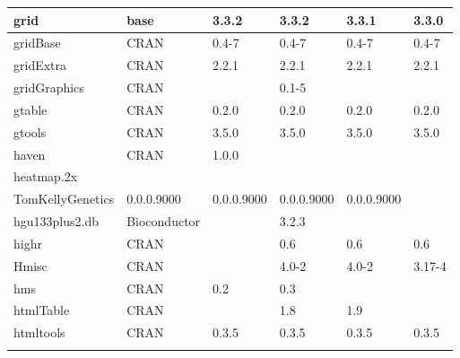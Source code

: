 \begin{longtable}{|llllll|}
grid                          & base                      & 3.3.2       & 3.3.2       & 3.3.1          & 3.3.0            \\ \hline
gridBase                      & CRAN                      & 0.4-7       & 0.4-7       & 0.4-7          & 0.4-7             \\ \hline \rowcolor{gray!25}
gridExtra                     & CRAN                      & 2.2.1       & 2.2.1       & 2.2.1          & 2.2.1            \\ \hline
gridGraphics                  & CRAN                      &             & 0.1-5       &                &                   \\ \hline \rowcolor{gray!25}
gtable                        & CRAN                      & 0.2.0       & 0.2.0       & 0.2.0          & 0.2.0            \\ \hline
gtools                        & CRAN                      & 3.5.0       & 3.5.0       & 3.5.0          & 3.5.0             \\ \hline \rowcolor{gray!25}
haven                         & CRAN                      & 1.0.0       &             &                &                  \\ \hline
heatmap.2x                    & \begin{tabular}[c]{@{}l@{}}GitHub \\ TomKellyGenetics \end{tabular}  & 0.0.0.9000  & 0.0.0.9000  & 0.0.0.9000     & 0.0.0.9000        \\ \hline \rowcolor{gray!25}
hgu133plus2.db                & Bioconductor              &             & 3.2.3       &                &                  \\ \hline
highr                         & CRAN                      &             & 0.6         & 0.6            & 0.6               \\ \hline \rowcolor{gray!25}
Hmisc                         & CRAN                      &             & 4.0-2       & 4.0-2          & 3.17-4           \\ \hline
hms                           & CRAN                      & 0.2         & 0.3         &                &                   \\ \hline \rowcolor{gray!25}
htmlTable                     & CRAN                      &             & 1.8         & 1.9            &                  \\ \hline
htmltools                     & CRAN                      & 0.3.5       & 0.3.5       & 0.3.5          & 0.3.5             \\ \hline \rowcolor{gray!25}

\end{longtable}
